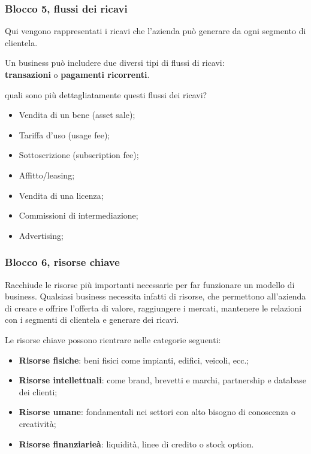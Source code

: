 \documentclass[14pt]{extarticle}
\begin{document}
\subsubsection{Blocco 5, flussi dei ricavi}

Qui vengono rappresentati i ricavi che l'azienda può generare da ogni segmento
di clientela.

Un business può includere due diversi tipi di flussi di ricavi:
\\\textbf{transazioni} o \textbf{pagamenti ricorrenti}.

quali sono più dettagliatamente questi flussi dei ricavi?

\begin{itemize}
    \item Vendita di un bene (asset sale);
    \item Tariffa d'uso (usage fee);
    \item Sottoscrizione (subscription fee);
    \item Affitto/leasing;
    \item Vendita di una licenza;
    \item Commissioni di intermediazione;
    \item Advertising;
\end{itemize}

\subsubsection{Blocco 6, risorse chiave}

Racchiude le risorse più importanti necessarie per far funzionare un modello di
business. Qualsiasi business necessita infatti di risorse, che permettono
all'azienda di creare e offrire l'offerta di valore, raggiungere i mercati,
mantenere le relazioni con i segmenti di clientela e generare dei ricavi.

Le risorse chiave possono rientrare nelle categorie seguenti:

\begin{itemize}
    \item \textbf{Risorse fisiche}: beni fisici come impianti, edifici, veicoli,
    ecc.;
    \item \textbf{Risorse intellettuali}: come brand, brevetti e marchi,
    partnership e database dei clienti;
    \item \textbf{Risorse umane}: fondamentali nei settori con alto bisogno di
    conoscenza o creatività;
    \item \textbf{Risorse finanziarieà}: liquidità, linee di credito o stock
    option.   
\end{itemize}
\end{document}

